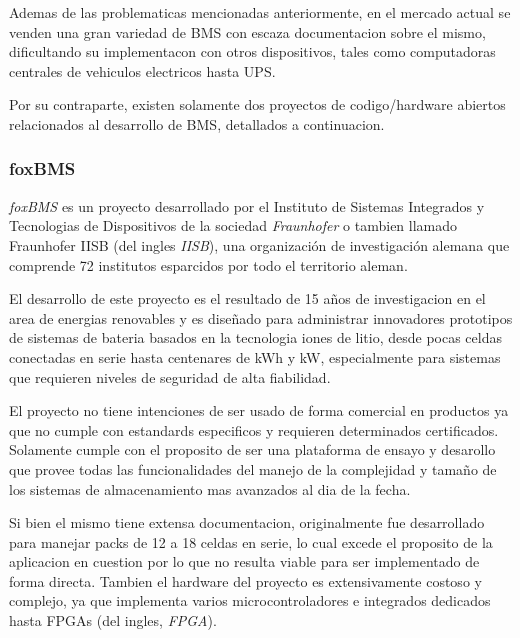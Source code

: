 \documentclass[10pt,a4paper]{article}
\begin{document}
    \noindent Ademas de las problematicas mencionadas anteriormente, en el 
    mercado actual se venden una gran variedad de \acrshort{BMS} con escaza documentacion  
    sobre el mismo, dificultando su implementacon con otros dispositivos, tales
    como computadoras centrales de vehiculos electricos hasta \acrshort{UPS}.
   
    \noindent Por su contraparte, existen solamente dos proyectos de 
    codigo/hardware abiertos relacionados al desarrollo de \acrshort{BMS}, detallados a
    continuacion.

    \subsubsection{foxBMS}

    \emph{foxBMS} es un proyecto desarrollado por el Instituto de Sistemas 
    Integrados y Tecnologias de Dispositivos de la sociedad \emph{Fraunhofer} o 
    tambien llamado Fraunhofer IISB (del ingles \emph{\acrfull{IISB}}), una organización de investigación 
    alemana que comprende 72 institutos esparcidos por todo el territorio
    aleman.
    
    \noindent El desarrollo de este proyecto es el resultado de 15 años de 
    investigacion en el area de energias renovables y es diseñado para 
    administrar innovadores prototipos de sistemas de bateria basados en la 
    tecnologia iones de litio, desde pocas celdas conectadas en serie hasta 
    centenares de kWh y kW, especialmente para sistemas que requieren niveles 
    de seguridad de alta fiabilidad.
    
    \noindent El proyecto no tiene intenciones de ser usado de forma comercial 
    en productos ya que no cumple con estandards especificos y requieren
    determinados certificados. Solamente cumple con el proposito de ser una
    plataforma de ensayo y desarollo que provee todas las funcionalidades del
    manejo de la complejidad y tamaño de los sistemas de almacenamiento mas
    avanzados al dia de la fecha.
    
    \noindent Si bien el mismo tiene extensa documentacion, originalmente fue
    desarrollado para manejar packs de 12 a 18 celdas en serie, lo cual excede
    el proposito de la aplicacion en cuestion por lo que no resulta viable para
    ser implementado de forma directa. Tambien el hardware del proyecto es
    extensivamente costoso y complejo, ya que implementa varios 
    microcontroladores e integrados dedicados hasta \acrshort{FPGA}s 
    (del ingles, \emph{\acrlong{FPGA}}).
\end{document}
